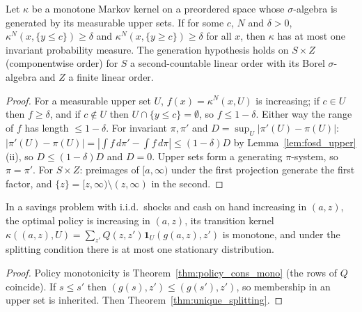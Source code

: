 \begin{theorem}
\label{thm:unique_splitting}
\leanok
{}
Let $\kappa$ be a monotone Markov kernel on a preordered space whose $\sigma$-algebra is generated by its measurable
upper sets. If for some $c$, $N$ and $\delta>0$, $\kappa^N(x,\{y\le c\})\ge\delta$ and $\kappa^N(x,\{y\ge c\})\ge\delta$
for all $x$, then $\kappa$ has at most one invariant probability measure. The generation hypothesis holds on $S\times Z$
(componentwise order) for $S$ a second-countable linear order with its Borel $\sigma$-algebra and $Z$ a finite linear order.
\end{theorem}
\begin{proof}
\leanok
For a measurable upper set $U$, $f(x)=\kappa^N(x,U)$ is increasing; if $c\in U$ then $f\ge\delta$, and if $c\notin U$
then $U\cap\{y\le c\}=\emptyset$, so $f\le1-\delta$. Either way the range of $f$ has length $\le1-\delta$. For invariant
$\pi,\pi'$ and $D=\sup_U|\pi'(U)-\pi(U)|$: $|\pi'(U)-\pi(U)| = |\int f\,d\pi'-\int f\,d\pi|\le(1-\delta)D$ by
Lemma~\ref{lem:fosd_upper}(ii), so $D\le(1-\delta)D$ and $D=0$. Upper sets form a generating $\pi$-system, so $\pi=\pi'$.
For $S\times Z$: preimages of $[a,\infty)$ under the first projection generate the first factor, and
$\{z\} = [z,\infty)\setminus(z,\infty)$ in the second.
\end{proof}

\begin{theorem}
\label{thm:savings_unique}
\leanok
{}
In a savings problem with i.i.d.\ shocks and cash on hand increasing in $(a,z)$, the optimal policy is increasing
in $(a,z)$, its transition kernel $\kappa((a,z),U)=\sum_{z'}Q(z,z')\mathbf 1_U(g(a,z),z')$ is monotone, and under
the splitting condition there is at most one stationary distribution.
\end{theorem}
\begin{proof}
\leanok
Policy monotonicity is Theorem~\ref{thm:policy_cons_mono} (the rows of $Q$ coincide). If $s\le s'$ then
$(g(s),z')\le(g(s'),z')$, so membership in an upper set is inherited. Then Theorem~\ref{thm:unique_splitting}.
\end{proof}

